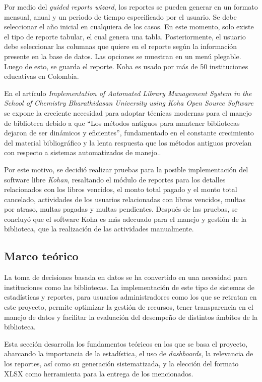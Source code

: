 \documentclass[spanish]{ieee_upb}
\begin{document}
Por medio del \textit{guided reports wizard}, los reportes se pueden generar en un formato mensual, anual y un periodo de tiempo especificado por el usuario. Se debe seleccionar el año inicial en cualquiera de los casos. En este momento, solo existe el tipo de reporte tabular, el cual genera una tabla. Posteriormente, el usuario debe seleccionar las columnas que quiere en el reporte según la información presente en la base de datos. Las opciones se muestran en un menú plegable. Luego de esto, se guarda el reporte. Koha es usado por más de 50 instituciones educativas en Colombia\cite{kohaDatosColombia}.

En el artículo \textit{Implementation of Automated Library Management System in the School
of Chemistry Bharathidasan University using Koha Open Source Software}\cite{colegioKoha} se expone la creciente necesidad para adoptar técnicas modernas para el manejo de biblioteca debido a que “Los métodos antiguos para mantener bibliotecas dejaron de ser dinámicos y eficientes'', fundamentado en el constante crecimiento del material bibliográfico y la lenta respuesta que los métodos antiguos proveían con respecto a sistemas automatizados de manejo.\cite{colegioKoha}. 

Por este motivo, se decidió realizar pruebas para la posible implementación del software libre \textit{Kohan}, resaltando el módulo de reportes para los detalles relacionados con los libros vencidos, el monto total pagado y el monto total cancelado, actividades de los usuarios relacionadas con libros vencidos, multas por atraso, multas pagadas y multas pendientes. Después de las pruebas, se concluyó que el software Koha es más adecuado para el manejo y gestión de la biblioteca, que la realización de las actividades manualmente.

\subsection{Marco teórico}
La toma de decisiones basada en datos se ha convertido en una necesidad para instituciones como las bibliotecas. La implementación de este tipo de sistemas de estadísticas y reportes, para usuarios administradores como los que se retratan en este proyecto, permite optimizar la gestión de recursos, tener transparencia en el manejo de datos y facilitar la evaluación del desempeño de distintos ámbitos de la biblioteca. 

\vspace{0.3cm}
Esta sección desarrolla los fundamentos teóricos en los que se basa el proyecto, abarcando la importancia de la estadística, el uso de \textit{dashboards}, la relevancia de los reportes, así como su generación sistematizada, y la elección del formato XLSX como herramienta para la entrega de los mencionados.
\end{document}
